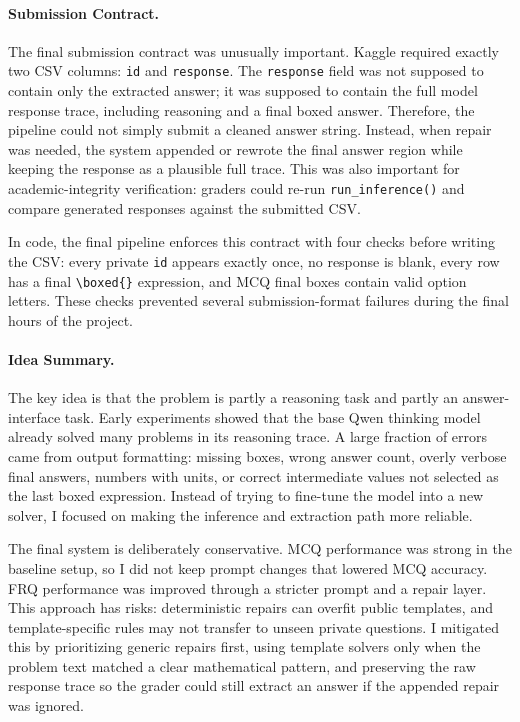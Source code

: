 \documentclass{article}
\begin{document}
\paragraph{Submission Contract.}
The final submission contract was unusually important. Kaggle required exactly two CSV columns: \texttt{id} and \texttt{response}. The \texttt{response} field was not supposed to contain only the extracted answer; it was supposed to contain the full model response trace, including reasoning and a final boxed answer. Therefore, the pipeline could not simply submit a cleaned answer string. Instead, when repair was needed, the system appended or rewrote the final answer region while keeping the response as a plausible full trace. This was also important for academic-integrity verification: graders could re-run \texttt{run\_inference()} and compare generated responses against the submitted CSV.

In code, the final pipeline enforces this contract with four checks before writing the CSV: every private \texttt{id} appears exactly once, no response is blank, every row has a final \texttt{\textbackslash boxed\{\}} expression, and MCQ final boxes contain valid option letters. These checks prevented several submission-format failures during the final hours of the project.

\paragraph{Idea Summary.}
The key idea is that the problem is partly a reasoning task and partly an answer-interface task. Early experiments showed that the base Qwen thinking model already solved many problems in its reasoning trace. A large fraction of errors came from output formatting: missing boxes, wrong answer count, overly verbose final answers, numbers with units, or correct intermediate values not selected as the last boxed expression. Instead of trying to fine-tune the model into a new solver, I focused on making the inference and extraction path more reliable.

The final system is deliberately conservative. MCQ performance was strong in the baseline setup, so I did not keep prompt changes that lowered MCQ accuracy. FRQ performance was improved through a stricter prompt and a repair layer. This approach has risks: deterministic repairs can overfit public templates, and template-specific rules may not transfer to unseen private questions. I mitigated this by prioritizing generic repairs first, using template solvers only when the problem text matched a clear mathematical pattern, and preserving the raw response trace so the grader could still extract an answer if the appended repair was ignored.
\end{document}
